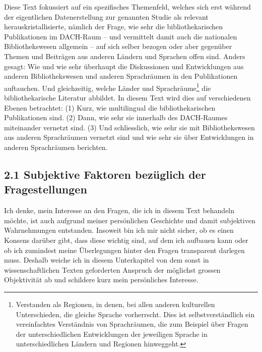 \documentclass[a4paper,
fontsize=11pt,
oneside,
numbers=noperiodatend,
parskip=half-,
bibliography=totoc,
final
]{scrartcl}
\begin{document}
Diese Text fokussiert auf ein spezifisches Themenfeld, welches sich erst
während der eigentlichen Datenerstellung zur genannten Studie als
relevant herauskristallisierte, nämlich der Frage, wie sehr die
bibliothekarischen Publikationen im DACH-Raum -- und vermittelt damit
auch die nationalen Bibliothekswesen allgemein -- auf sich selber
bezogen oder aber gegenüber Themen und Beiträgen aus anderen Ländern und
Sprachen offen sind. Anders gesagt: Wie und wie sehr überhaupt die
Diskussionen und Entwicklungen aus anderen Bibliothekswesen und anderen
Sprachräumen in den Publikationen auftauchen. Und gleichzeitig, welche
Länder und Sprachräume\footnote{Verstanden als Regionen, in denen, bei
  allen anderen kulturellen Unterschieden, die gleiche Sprache
  vorherrscht. Dies ist selbstverständlich ein vereinfachtes Verständnis
  von Sprachräumen, die zum Beispiel über Fragen der unterschiedlichen
  Entwicklungen der jeweiligen Sprache in unterschiedlichen Ländern und
  Regionen hinweggeht.} die bibliothekarische Literatur abbildet. In
diesem Text wird dies auf verschiedenen Ebenen betrachtet: (1) Kurz, wie
multilingual die bibliothekarischen Publikationen sind. (2) Dann, wie
sehr sie innerhalb des DACH-Raumes miteinander vernetzt sind. (3) Und
schliesslich, wie sehr sie mit Bibliothekswesen aus anderen Sprachräumen
vernetzt sind und wie sehr sie über Entwicklungen in anderen
Sprachräumen berichten.

\hypertarget{subjektive-faktoren-bezuxfcglich-der-fragestellungen}{%
\subsection{2.1 Subjektive Faktoren bezüglich der
Fragestellungen}\label{subjektive-faktoren-bezuxfcglich-der-fragestellungen}}

Ich denke, mein Interesse an den Fragen, die ich in diesem Text
behandeln möchte, ist auch aufgrund meiner persönlichen Geschichte und
damit subjektiven Wahrnehmungen entstanden. Insoweit bin ich mir nicht
sicher, ob es einen Konsens darüber gibt, dass diese wichtig sind, auf
dem ich aufbauen kann oder ob ich zumindest meine Überlegungen hinter
den Fragen transparent darlegen muss. Deshalb weiche ich in diesem
Unterkapitel von dem sonst in wissenschaftlichen Texten geforderten
Anspruch der möglichst grossen Objektivität ab und schildere kurz mein
persönliches Interesse.
\end{document}
